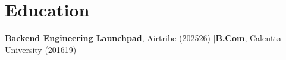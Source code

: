 \documentclass[a4paper,10pt]{article}
\begin{document}
\section{Education}
\noindent
\textbf{Backend Engineering Launchpad}, Airtribe (2025\textendash{}26) \quad\textcolor{accent}{$|$}\quad \textbf{B.Com}, Calcutta University (2016\textendash{}19)
\end{document}
